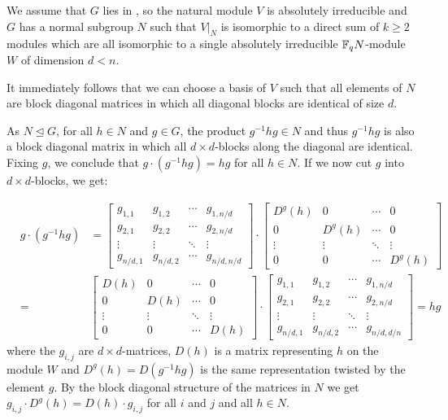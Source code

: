 We assume that $G$ lies in , so the natural module $V$ is
absolutely irreducible and $G$ has a normal subgroup $N$ such that
$V|_N$ is isomorphic to a direct sum of $k\ge 2$ modules which are all
isomorphic to a single absolutely irreducible $\mathbb{F}_q N$-module $W$
of dimension $d < n$.

It immediately follows that we can choose a basis of $V$ such that all
elements of $N$ are block diagonal matrices in which all diagonal blocks
are identical of size $d$.

As $N \unlhd G$, for all $h \in N$ and $g \in G$,
 the product $g^{-1}hg \in N$ and thus $g^{-1} h g$ is also 
a block diagonal matrix in which all $d \times d$-blocks along the diagonal
are identical. Fixing $g$, we conclude that $g\cdot (g^{-1}hg) = hg$ for all
$h \in N$. If we now cut $g$ into $d \times d$-blocks, we get:

\begin{eqnarray*}
   &g \cdot (g^{-1}hg) & 
 = \left[ \begin{array}{c|c|c|c}
      g_{1,1} & g_{1,2} & \cdots & g_{1,n/d} \\ \hline
      g_{2,1} & g_{2,2} & \cdots & g_{2,n/d} \\ \hline
      \vdots  & \vdots  & \ddots & \vdots    \\ \hline
      g_{n/d,1}&g_{n/d,2}& \cdots& g_{n/d,n/d} \end{array} \right]
\cdot \left[ \begin{array}{c|c|c|c}
      D^g(h) & 0   & \cdots &      0    \\ \hline
         0   &D^g(h)&\cdots &      0    \\ \hline
      \vdots  & \vdots  & \ddots & \vdots    \\ \hline
         0    &    0    & \cdots& D^g(h) \end{array} \right] \\
 &=& \left[ \begin{array}{c|c|c|c}
      D(h)    & 0       & \cdots &     0    \\ \hline
         0    &D(h)     &\cdots &      0    \\ \hline
      \vdots  & \vdots  & \ddots & \vdots    \\ \hline
         0    &    0    & \cdots& D(h)   \end{array} \right]
\cdot \left[ \begin{array}{c|c|c|c}
      g_{1,1} & g_{1,2} & \cdots & g_{1,n/d} \\ \hline
      g_{2,1} & g_{2,2} & \cdots & g_{2,n/d} \\ \hline
      \vdots  & \vdots  & \ddots & \vdots    \\ \hline
      g_{n/d,1}&g_{n/d,2}& \cdots& g_{n/d,d/n} \end{array} \right]
 = hg
\end{eqnarray*}
where the $g_{i,j}$ are $d \times d$-matrices, $D(h)$ is a matrix
representing $h$ on the module $W$ and $D^g(h) = D(g^{-1}hg)$ is the
same representation twisted by the element $g$. By the block diagonal
structure of the matrices in $N$ we get 
$g_{i,j} \cdot D^g(h) = D(h) \cdot g_{i,j}$ for all $i$ and $j$ and 
all $h \in N$.

